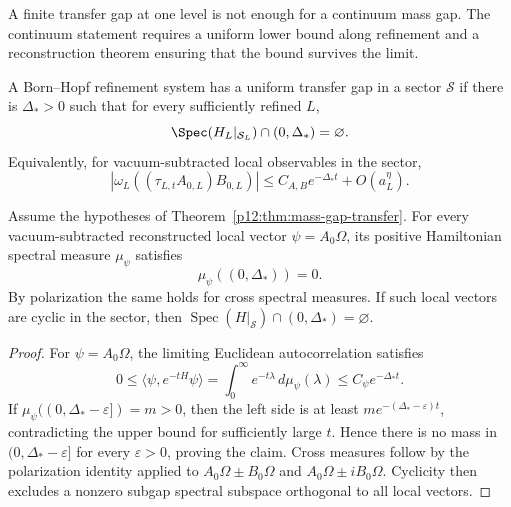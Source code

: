 \documentclass[12pt,a4paper]{article}
\begin{document}
A finite transfer gap at one level is not enough for a continuum mass gap.  The continuum statement requires a uniform lower bound along refinement and a reconstruction theorem ensuring that the bound survives the limit.

\begin{definition}
\label{p12:def:uniform-transfer-gap}
A Born--Hopf refinement system has a uniform transfer gap in a sector \(\mathcal S\) if there is \(\Delta_\ast>0\) such that for every sufficiently refined \(L\),
\begin{equation}
\label{p12:eq:uniform-transfer-gap}
\Spec(H_L|_{\mathcal S_L})\cap(0,\Delta_\ast)=\varnothing .
\end{equation}
Equivalently, for vacuum-subtracted local observables in the sector,
\begin{equation}
\label{p12:eq:uniform-correlation-decay}
|\omega_L((\tau_{L,t}A_{0,L})B_{0,L})|
\le C_{A,B}e^{-\Delta_\ast t}+O(a_L^\eta).
\end{equation}
\end{definition}



\begin{lemma}
\label{p12:lem:sector-spectral-measure-gap-discharge}
Assume the hypotheses of Theorem~\ref{p12:thm:mass-gap-transfer}.  For every vacuum-subtracted reconstructed local vector \(\psi=A_0\Omega\), its positive Hamiltonian spectral measure \(\mu_\psi\) satisfies
\begin{equation}
\label{p12:eq:sector-spectral-measure-gap-discharge}
\mu_\psi((0,\Delta_*))=0.
\end{equation}
By polarization the same holds for cross spectral measures.  If such local vectors are cyclic in the sector, then \(\operatorname{Spec}(H|_{\mathcal S})\cap(0,\Delta_*)=\varnothing\).
\end{lemma}
\begin{proof}
For \(\psi=A_0\Omega\), the limiting Euclidean autocorrelation satisfies
\[
0\le\langle\psi,e^{-tH}\psi\rangle=\int_0^\infty e^{-t\lambda}\,d\mu_\psi(\lambda)\le C_\psi e^{-\Delta_*t}.
\]
If \(\mu_\psi((0,\Delta_* -\varepsilon])=m>0\), then the left side is at least \(m e^{-(\Delta_* -\varepsilon)t}\), contradicting the upper bound for sufficiently large \(t\).  Hence there is no mass in \((0,\Delta_* -\varepsilon]\) for every \(\varepsilon>0\), proving the claim.  Cross measures follow by the polarization identity applied to \(A_0\Omega\pm B_0\Omega\) and \(A_0\Omega\pm iB_0\Omega\).  Cyclicity then excludes a nonzero subgap spectral subspace orthogonal to all local vectors.
\end{proof}
\end{document}
